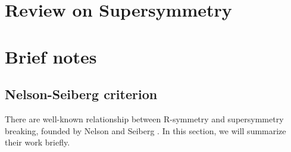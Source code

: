 \documentclass[a4paper,pdftex,10pt]{report}
\begin{document}
\maketitle

\tableofcontents

\clearpage
\chapter{Review on Supersymmetry}



















\clearpage
\appendix
\chapter{Brief notes}


\section{Nelson-Seiberg criterion}

There are well-known relationship between R-symmetry and supersymmetry breaking, founded by Nelson and Seiberg \cite{Nelson:1993nf}. In this section, we will summarize their work briefly.


















\clearpage



\nocite{Nelson:1993nf}
\nocite{Martin:1997ns}

\end{document}
